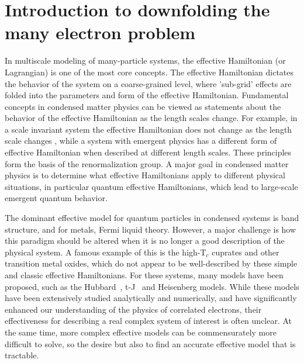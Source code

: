 \section{Introduction to downfolding the many electron problem}

In multiscale modeling of many-particle systems, the effective Hamiltonian (or Lagrangian) is one of the most core concepts. 
The effective Hamiltonian dictates the behavior of the system on a coarse-grained level, where 'sub-grid' effects are folded into the parameters and form of the effective Hamiltonian. 
Fundamental concepts in condensed matter physics can be viewed as statements about the behavior of the effective Hamiltonian as the length scales change. 
For example, in a scale invariant system the effective Hamiltonian does not change as the length scale changes , while a system with emergent physics has a different form of effective Hamiltonian when described at different length scales. 
These principles form the basis of the renormalization group\cite{Wilson}.
A major goal in condensed matter physics is to determine what effective Hamiltonians apply to different physical situations, in particular quantum effective Hamiltonians, which lead to large-scale emergent quantum behavior. 

The dominant effective model for quantum particles in condensed systems is band structure, and for metals, Fermi liquid theory. 
However, a major challenge is how this paradigm should be altered when it is no longer a good description of the physical system.
A famous example of this is the high-T$_c$ cuprates and other transition metal oxides, which do not appear to be well-described by these simple and classic effective Hamiltonians. 
For these systems, many models have been proposed, such as the Hubbard~\cite{Hubbard}, t-J~\cite{tJSpalek} and Heisenberg models.
While these models have been extensively studied analytically and numerically, and have significantly enhanced our understanding of the physics of correlated electrons, their effectiveness for describing a real complex system of interest is often unclear. 
At the same time, more complex effective models can be commensurately more difficult to solve, so the desire but also to find an accurate effective model that is tractable. 



